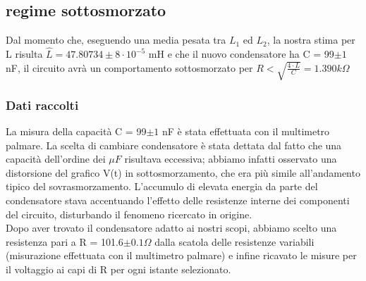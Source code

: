 \documentclass[a4paper]{article}
\theoremstyle{definition}
\begin{document}
\begin{figure}[!h]
\hfill
{}
\hfill
{}
\hfill
\caption{ }
\label{fig:RLC}
\end{figure}



\subsection{regime sottosmorzato}
\label{subsec:sottosmorzamento}

Dal momento che, eseguendo una media pesata tra \(L_{1}\) ed \(L_{2}\), la nostra stima per L risulta \(\hat{L} = 47.80734 \pm 8 \cdot 10^{-5} \) mH e che il nuovo condensatore ha C = 99\(\pm 1\) nF, il circuito avrà un comportamento sottosmorzato per \(R < \sqrt{\frac{4 \cdot L}{C}} = 1.390 k\Omega \)

\subsubsection*{Dati raccolti}
La misura della capacità C = 99\( \pm 1\) nF è stata effettuata con il multimetro palmare. La scelta di cambiare condensatore è stata dettata dal fatto che una capacità dell'ordine dei \(\mu F\) risultava eccessiva; abbiamo infatti osservato una distorsione del grafico V(t) in sottosmorzamento, che era più simile all'andamento tipico del sovrasmorzamento.  L'accumulo di elevata energia da parte del condensatore stava accentuando l'effetto delle resistenze interne dei componenti del circuito, disturbando il fenomeno ricercato in origine. \\
Dopo aver trovato il condensatore adatto ai nostri scopi, abbiamo scelto una resistenza pari a R = 101.6\(\pm 0.1 \Omega\) dalla scatola delle resistenze variabili (misurazione effettuata con il multimetro palmare) e infine ricavato le misure per il voltaggio ai capi di R per ogni istante selezionato.
\end{document}

